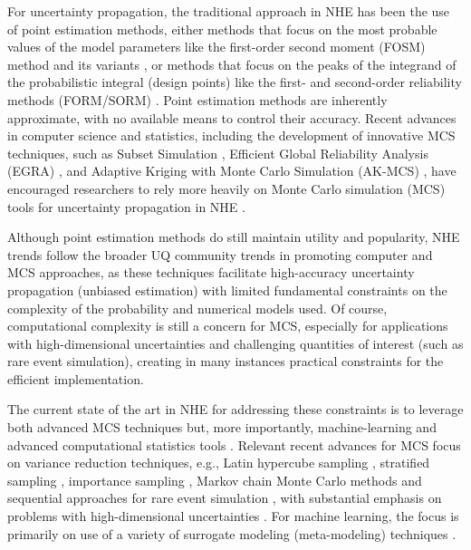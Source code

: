 For uncertainty propagation, the traditional approach in NHE has been the use of point estimation methods, either methods that focus on the most probable values of the model parameters like the first-order second moment (FOSM) method \citep{baker2008uncertainty} and its variants \citep{vamvatsikos2013derivation}, or methods that focus on the peaks of the integrand of the probabilistic integral (design points) like the first- and second-order reliability methods (FORM/SORM) \citep{koduru2010feasibility}. Point estimation methods are inherently approximate, with no available means to control their accuracy. Recent advances in computer science and statistics, including the development of innovative MCS techniques, such as Subset Simulation \citep{au2003subset}, Efficient Global Reliability Analysis (EGRA) \citep{bichon2013efficient}, and Adaptive Kriging with Monte Carlo Simulation (AK-MCS) \citep{echard2011akmcs}, have encouraged researchers to rely more heavily on Monte Carlo simulation (MCS) tools for uncertainty propagation in NHE \citep{smith2011monte, taflanidis2011simulationbased, vamvatsikos2014seismic, esposito2015simulation, deb2019parametric}. 

Although point estimation methods do still maintain utility and popularity, NHE trends follow the broader UQ community trends in promoting computer and MCS approaches, as these techniques facilitate high-accuracy uncertainty propagation (unbiased estimation) with limited fundamental constraints on the complexity of the probability and numerical models used. Of course, computational complexity is still a concern for MCS, especially for applications with high-dimensional uncertainties and challenging quantities of interest (such as rare event simulation), creating in many instances practical constraints for the efficient implementation.

The current state of the art in NHE for addressing these constraints is to leverage both advanced MCS techniques \citep{au2003subset, li2017system, bansal2018subset} but, more importantly, machine-learning and advanced computational statistics tools \citep{echard2011akmcs, abbiati2017hierarchical, ding2018multifidelity, su2018efficient, wang2018bayesian}. Relevant recent advances for MCS focus on variance reduction techniques, e.g., Latin hypercube sampling \citep{vamvatsikos2014seismic}, stratified sampling \citep{jayaram2010efficient}, importance sampling \citep{papaioannou2018reliability}, Markov chain Monte Carlo methods \citep{au2003subset} and sequential approaches for rare event simulation \citep{jia2017new}, with substantial emphasis on problems with high-dimensional uncertainties \citep{au2003subset, wang2016crossentropybased}. For machine learning, the focus is primarily on use of a variety of surrogate modeling (meta-modeling) techniques \citep{stern2017accelerated, zhang2018adaptive, bernier2019fragility, gentile2020gaussian, le2020neural, zhang2020physicsguided}.

